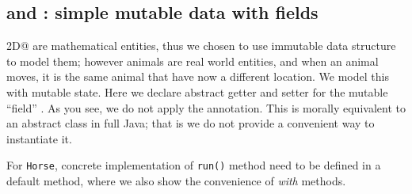 %
%

\subsection{\Q@Animal@ and \Q@Horse@: simple mutable data with fields}
\Q@Points2D@ are mathematical entities, thus we chosen to use immutable data structure to model them; however animals are real world entities, and when an animal moves, it is the same animal that have now a different location. We model this with mutable state.
Here we declare abstract getter and setter for the mutable ``field'' \Q@location@.
As you see, we do not apply the \mixin annotation. This is morally equivalent to an abstract class in full Java; that is we do not provide a convenient way to instantiate it.


For \texttt{Horse}, concrete implementation of \texttt{run()} method
need to be defined in a default method, where 
we also show the convenience of \emph{with} methods.

